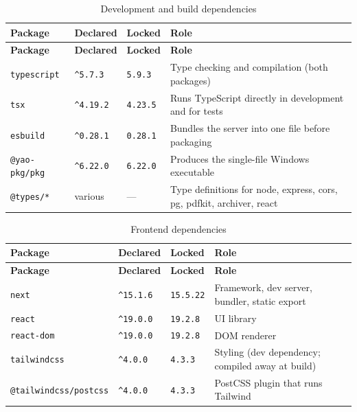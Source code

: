 \documentclass[11pt,a4paper]{report}
\newcommand{\code}[1]{\texttt{\small #1}}
\newcommand{\ver}[1]{\texttt{#1}}
\begin{document}
\begin{longtable}{@{}>{\raggedright\arraybackslash}p{3.3cm}>{\raggedright\arraybackslash}p{1.6cm}>{\raggedright\arraybackslash}p{2.0cm}>{\raggedright\arraybackslash}p{7.2cm}@{}}
\caption{Development and build dependencies}\label{tab:deps-dev}\\
\toprule
\textbf{Package} & \textbf{Declared} & \textbf{Locked} & \textbf{Role}\\
\midrule
\endfirsthead
\toprule
\textbf{Package} & \textbf{Declared} & \textbf{Locked} & \textbf{Role}\\
\midrule
\endhead
\bottomrule
\endfoot
\code{typescript}    & \code{\^{}5.7.3}  & \ver{5.9.3}  & Type checking and compilation (both packages)\\
\code{tsx}           & \code{\^{}4.19.2} & \ver{4.23.5} & Runs TypeScript directly in development and for tests\\
\code{esbuild}       & \code{\^{}0.28.1} & \ver{0.28.1} & Bundles the server into one file before packaging\\
\code{@yao-pkg/pkg}  & \code{\^{}6.22.0} & \ver{6.22.0} & Produces the single-file Windows executable\\
\code{@types/*}      & various           & ---          & Type definitions for node, express, cors, pg, pdfkit, archiver, react\\
\end{longtable}

\begin{longtable}{@{}>{\raggedright\arraybackslash}p{3.5cm}>{\raggedright\arraybackslash}p{1.8cm}>{\raggedright\arraybackslash}p{2.0cm}>{\raggedright\arraybackslash}p{7.0cm}@{}}
\caption{Frontend dependencies}\label{tab:deps-frontend}\\
\toprule
\textbf{Package} & \textbf{Declared} & \textbf{Locked} & \textbf{Role}\\
\midrule
\endfirsthead
\toprule
\textbf{Package} & \textbf{Declared} & \textbf{Locked} & \textbf{Role}\\
\midrule
\endhead
\bottomrule
\endfoot
\code{next}                  & \code{\^{}15.1.6} & \ver{15.5.22} & Framework, dev server, bundler, static export\\
\code{react}                 & \code{\^{}19.0.0} & \ver{19.2.8}  & UI library\\
\code{react-dom}             & \code{\^{}19.0.0} & \ver{19.2.8}  & DOM renderer\\
\code{tailwindcss}           & \code{\^{}4.0.0}  & \ver{4.3.3}   & Styling (dev dependency; compiled away at build)\\
\code{@tailwindcss/postcss}  & \code{\^{}4.0.0}  & \ver{4.3.3}   & PostCSS plugin that runs Tailwind\\
\end{longtable}
\end{document}
